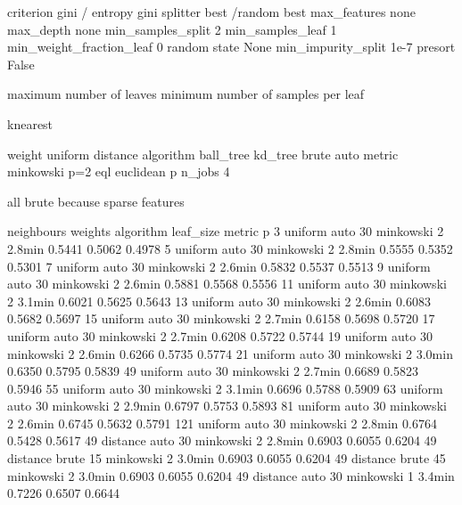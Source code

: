 \documentclass[11pt]{article}
\begin{document}
criterion gini / entropy gini
splitter best /random best
max_features none
max_depth none
min_samples_split 2
min_samples_leaf 1
min_weight_fraction_leaf 0
random state None
min_impurity_split 1e-7
presort False




maximum number of leaves
minimum number of samples per leaf

knearest

weight uniform distance
algorithm ball_tree kd_tree brute auto
metric minkowski p=2 eql euclidean
p
n_jobs 4

all brute because sparse features

neighbours weights algorithm leaf_size metric p
3 uniform auto 30 minkowski 2 2.8min 0.5441    0.5062    0.4978
5 uniform auto 30 minkowski 2 2.8min 0.5555    0.5352    0.5301
7 uniform auto 30 minkowski 2 2.6min 0.5832    0.5537    0.5513
9 uniform auto 30 minkowski 2 2.6min  0.5881    0.5568    0.5556
11 uniform auto 30 minkowski 2 3.1min 0.6021    0.5625    0.5643
13 uniform auto 30 minkowski 2 2.6min  0.6083    0.5682    0.5697
15 uniform auto 30 minkowski 2 2.7min 0.6158    0.5698    0.5720
17 uniform auto 30 minkowski 2 2.7min 0.6208    0.5722    0.5744
19 uniform auto 30 minkowski 2 2.6min 0.6266    0.5735    0.5774
21 uniform auto 30 minkowski 2 3.0min 0.6350    0.5795    0.5839
49 uniform auto 30 minkowski 2 2.7min 0.6689    0.5823    0.5946
55 uniform auto 30 minkowski 2 3.1min 0.6696    0.5788    0.5909
63 uniform auto 30 minkowski 2 2.9min 0.6797    0.5753    0.5893
81 uniform auto 30 minkowski 2 2.6min 0.6745    0.5632    0.5791
121 uniform auto 30 minkowski 2 2.8min 0.6764    0.5428    0.5617
49 distance auto 30 minkowski 2 2.8min 0.6903    0.6055    0.6204
49 distance brute 15 minkowski 2 3.0min  0.6903    0.6055    0.6204
49 distance brute 45 minkowski 2 3.0min  0.6903    0.6055    0.6204
49 distance auto 30 minkowski 1 3.4min 0.7226    0.6507    0.6644

\end{document}
